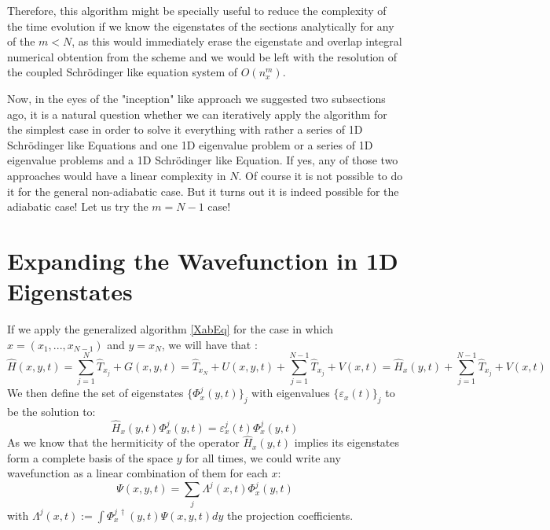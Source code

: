 \documentclass[11pt, a4paper]{article} %
\begin{document}
Therefore, this algorithm might be specially useful to reduce the complexity of the time evolution if we know the eigenstates of the sections analytically for any of the $m<N$, as this would immediately erase the eigenstate and overlap integral numerical obtention from the scheme and we would be left with the resolution of the coupled Schrödinger like equation system of $O(n_x^{m})$.

Now, in the eyes of the "inception" like approach we suggested two subsections ago, it is a natural question whether we can iteratively apply the algorithm for the simplest case in order to solve it everything with rather a series of 1D Schrödinger like Equations and one 1D eigenvalue problem or a series of 1D eigenvalue problems and a 1D Schrödinger like Equation. If yes, any of those two approaches would have a linear complexity in $N$. Of course it is not possible to do it for the general non-adiabatic case. But it turns out it is indeed possible for the adiabatic case! Let us try the $m=N-1$ case!

\newpage

\section{Expanding the Wavefunction in 1D Eigenstates}
If we apply the generalized algorithm \eqref{XabEq} for the case in which $x=(x_1,...,x_{N-1})$ and $y=x_N$, we will have that :
\begin{equation}
\hat{H}(x, y, t)= \sum_{j=1}^{N}\hat{T}_{x_j}+G(x, y, t)=\hat{T}_{x_N}+U(x, y, t)+\sum_{j=1}^{N-1}\hat{T}_{x_j}+V(x,t) = \hat{H}_x(y,t)+\sum_{j=1}^{N-1}\hat{T}_{x_j}+V(x,t)
\end{equation}
We then define the set of eigenstates $\{\Phi^j_x(y,t)\}_j$ with eigenvalues $\{\varepsilon_x(t)\}_j$ to be the solution to:
\begin{equation}
\hat{H}_x(y,t)\Phi^j_x(y,t)=\varepsilon^j_x(t)\Phi^j_x(y,t)
\end{equation}
As we know that the hermiticity of the operator $\hat{H}_x(y,t)$ implies its eigenstates form a complete basis of the space $y$ for all times, we could write any wavefunction as a linear combination of them for each $x$:
\begin{equation}
\Psi(x,y,t)=\sum_j \Lambda^j(x,t) \Phi^j_x(y,t)
\end{equation}
with $\Lambda^j(x,t):= \int \Phi^{j\ \dagger}_x(y,t) \Psi(x,y,t)dy$ the projection coefficients.
\end{document}
